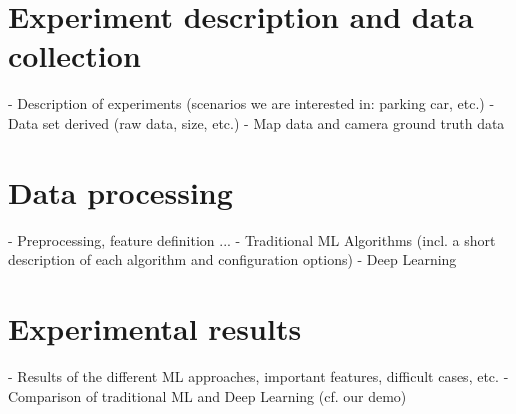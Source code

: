 \section{Experiment description and data collection}
\label{sec:experiment_description_data_collection}
- Description of experiments (scenarios we are interested in: parking car, etc.)
- Data set derived (raw data, size, etc.)
- Map data and camera ground truth data

\section{Data processing}
\label{sec:data_processing}
- Preprocessing, feature definition ...
- Traditional ML Algorithms (incl. a short description of each algorithm and configuration options)
- Deep Learning

\section{Experimental results}
- Results of the different ML approaches, important features, difficult cases, etc.
- Comparison of traditional ML and Deep Learning (cf. our demo)